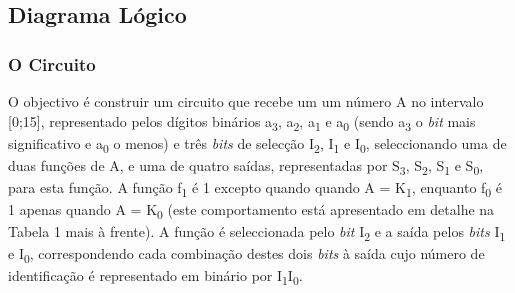 \documentclass[a4paper,12pt]{article}
\begin{document}
\subsection{Diagrama Lógico}
\subsubsection{O Circuito}
O objectivo é construir um circuito que recebe um um número A no intervalo 
[0;15], representado pelos dígitos binários a\textsubscript{3}, 
a\textsubscript{2}, a\textsubscript{1} e a\textsubscript{0} (sendo 
a\textsubscript{3} o {\it bit} mais significativo e a\textsubscript{0} o menos) 
e três {\it bits} de selecção I\textsubscript{2}, I\textsubscript{1} e 
I\textsubscript{0}, seleccionando uma de duas funções de A, e uma de quatro 
saídas, representadas por S\textsubscript{3}, S\textsubscript{2}, 
S\textsubscript{1} e S\textsubscript{0}, para esta função. A função 
f\textsubscript{1} é 1 excepto quando quando A = K\textsubscript{1}, enquanto 
f\textsubscript{0} é 1 apenas quando A = K\textsubscript{0} (este 
comportamento está apresentado em detalhe na Tabela 1 mais à frente). A 
função é seleccionada pelo {\it bit} I\textsubscript{2} e a saída pelos 
{\it bits} I\textsubscript{1} e I\textsubscript{0}, correspondendo cada 
combinação destes dois {\it bits} à saída cujo número de identificação 
é representado em binário por I\textsubscript{1}I\textsubscript{0}.
\par
\end{document}
